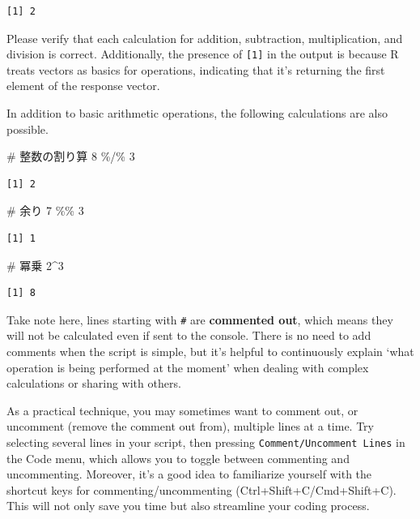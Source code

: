 \documentclass[
  a4paper,
]{book}
\newenvironment{Shaded}{\begin{snugshade}}{\end{snugshade}}
\newcommand{\CommentTok}[1]{\textcolor[rgb]{0.37,0.37,0.37}{#1}}
\newcommand{\DecValTok}[1]{\textcolor[rgb]{0.68,0.00,0.00}{#1}}
\newcommand{\SpecialCharTok}[1]{\textcolor[rgb]{0.37,0.37,0.37}{#1}}
\begin{document}
\begin{verbatim}
[1] 2
\end{verbatim}

Please verify that each calculation for addition, subtraction,
multiplication, and division is correct. Additionally, the presence of
\texttt{{[}1{]}} in the output is because R treats vectors as basics for
operations, indicating that it's returning the first element of the
response vector.

In addition to basic arithmetic operations, the following calculations
are also possible.

\begin{Shaded}
\begin{Highlighting}[]
\CommentTok{\# 整数の割り算}
\DecValTok{8} \SpecialCharTok{\%/\%} \DecValTok{3}
\end{Highlighting}
\end{Shaded}

\begin{verbatim}
[1] 2
\end{verbatim}

\begin{Shaded}
\begin{Highlighting}[]
\CommentTok{\# 余り}
\DecValTok{7} \SpecialCharTok{\%\%} \DecValTok{3}
\end{Highlighting}
\end{Shaded}

\begin{verbatim}
[1] 1
\end{verbatim}

\begin{Shaded}
\begin{Highlighting}[]
\CommentTok{\# 冪乗}
\DecValTok{2}\SpecialCharTok{\^{}}\DecValTok{3}
\end{Highlighting}
\end{Shaded}

\begin{verbatim}
[1] 8
\end{verbatim}

Take note here, lines starting with \texttt{\#} are \textbf{commented
out}, which means they will not be calculated even if sent to the
console. There is no need to add comments when the script is simple, but
it's helpful to continuously explain `what operation is being performed
at the moment' when dealing with complex calculations or sharing with
others.

As a practical technique, you may sometimes want to comment out, or
uncomment (remove the comment out from), multiple lines at a time. Try
selecting several lines in your script, then pressing
\texttt{Comment/Uncomment\ Lines} in the Code menu, which allows you to
toggle between commenting and uncommenting. Moreover, it's a good idea
to familiarize yourself with the shortcut keys for
commenting/uncommenting (Ctrl+Shift+C/Cmd+Shift+C). This will not only
save you time but also streamline your coding process.
\end{document}
